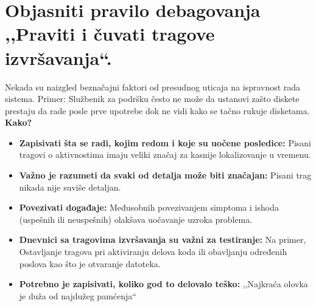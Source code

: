 \documentclass[a4paper]{article}
\begin{document}
\section{Objasniti pravilo debagovanja ,,Praviti i čuvati tragove izvršavanja``.}
  Nekada su naizgled beznačajni faktori od presudnog uticaja na ispravnost rada sistema.
  Primer: Službenik za podršku često ne može da ustanovi zašto diskete prestaju da rade
  posle prve upotrebe dok ne vidi kako se tačno rukuje disketama.\\
  \textbf{Kako?}
  \begin{itemize}
    \item \textbf{Zapisivati šta se radi, kojim redom i koje su uočene posledice:} Pisani tragovi o
          aktivnostima imaju veliki značaj za kasnije lokalizovanje u vremenu.
    \item \textbf{Važno je razumeti da svaki od detalja može biti značajan:} Pisani trag nikada nije
          suviše detaljan.
    \item \textbf{Povezivati događaje:} Međusobnih povezivanjem simptoma i ishoda (uspešnih ili 
          neuspešnih) olakšava uočavanje uzroka problema.
    \item \textbf{Dnevnici sa tragovima izvršavanja su važni za testiranje:} Na primer,
          Ostavljanje tragova pri aktiviranju delova koda ili obavljanju određenih poslova
          kao što je otvaranje datoteka.
    \item \textbf{Potrebno je zapisivati, koliko god to delovalo teško:} ,,Najkraća olovka je duža
          od najdužeg pamćenja``
  \end{itemize}
\end{document}
